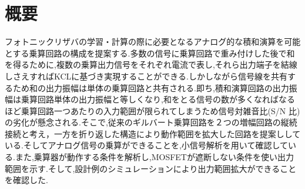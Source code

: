 \chapter*{概要}
フォトニックリザバの学習・計算の際に必要となるアナログ的な積和演算を可能とする乗算回路の構成を提案する.多数の信号に乗算回路で重み付けした後で和を得るために,複数の乗算出力信号をそれぞれ電流で表し,それら出力端子を結線しさえすればKCLに基づき実現することができる.しかしながら信号線を共有するため和の出力振幅は単体の乗算回路と共有される.即ち,積和演算回路の出力振幅は乗算回路単体の出力振幅と等しくなり,和をとる信号の数が多くなればなるほど乗算回路一つあたりの入力範囲が限られてしまうため信号対雑音比(S/N 比)の劣化が懸念される.そこで,従来のギルバート乗算回路を２つの増幅回路の縦続接続と考え，一方を折り返した構造により動作範囲を拡大した回路を提案ししている.そしてアナログ信号の乗算ができることを,小信号解析を用いて確認している.また,乗算器が動作する条件を解析し,MOSFETが遮断しない条件を使い出力範囲を示す.そして,設計例のシミュレーションにより出力範囲拡大ができることを確認した.
